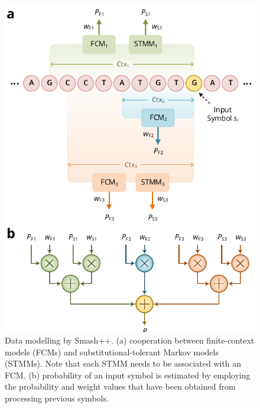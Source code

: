 \documentclass[a4paper,num-refs]{oup-contemporary}
\begin{document}
\begin{figure}[!t]
  \centering
  \includegraphics[width=\columnwidth]{fig/data_model.pdf}
  \caption{Data modelling by Smash++. (a) cooperation between finite-context models (FCMs) and substitutional-tolerant Markov models (STMMs). Note that each STMM needs to be associated with an FCM. (b) probability of an input symbol is estimated by employing the probability and weight values that have been obtained from processing previous symbols.}
  \label{fig.model}
\end{figure}
\end{document}
